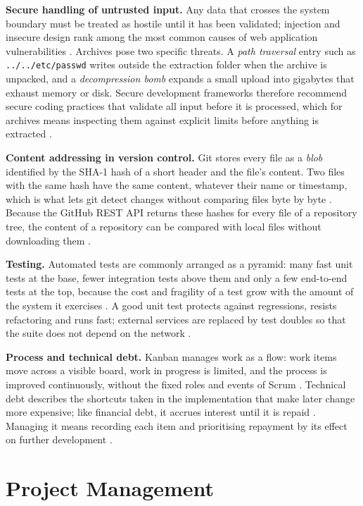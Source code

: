 \documentclass[a4paper,11pt]{article}
\begin{document}
\textbf{Secure handling of untrusted input.} Any data that crosses the system
boundary must be treated as hostile until it has been validated; injection and
insecure design rank among the most common causes of web application
vulnerabilities \citep{OWASP2021}. Archives pose two specific threats. A
\textit{path traversal} entry such as \texttt{../../etc/passwd} writes outside
the extraction folder when the archive is unpacked, and a
\textit{decompression bomb} expands a small upload into gigabytes that exhaust
memory or disk. Secure development frameworks therefore recommend secure coding
practices that validate all input before it is processed, which for archives
means inspecting them against explicit limits before anything is extracted
\citep{NIST2022}.

\textbf{Content addressing in version control.} Git stores every file as a
\textit{blob} identified by the SHA-1 hash of a short header and the file's
content. Two files with the same hash have the same content, whatever their name
or timestamp, which is what lets git detect changes without comparing files
byte by byte \citep{Chacon2024}. Because the GitHub REST API returns these
hashes for every file of a repository tree, the content of a repository can be
compared with local files without downloading them \citep{GitHubAPI2025}.

\textbf{Testing.} Automated tests are commonly arranged as a pyramid: many fast
unit tests at the base, fewer integration tests above them and only a few
end-to-end tests at the top, because the cost and fragility of a test grow with
the amount of the system it exercises \citep{Winters2020}. A good unit test
protects against regressions, resists refactoring and runs fast; external
services are replaced by test doubles so that the suite does not depend on the
network \citep{Khorikov2020}.

\textbf{Process and technical debt.} Kanban manages work as a flow: work items
move across a visible board, work in progress is limited, and the process is
improved continuously, without the fixed roles and events of Scrum
\citep{Kim2021, Schwaber2020}. Technical debt describes the shortcuts taken in
the implementation that make later change more expensive; like financial debt,
it accrues interest until it is repaid \citep{Avgeriou2023}. Managing it means
recording each item and prioritising repayment by its effect on further
development \citep{Lenarduzzi2021}.

\section{Project Management}\label{sec:management}
\end{document}
